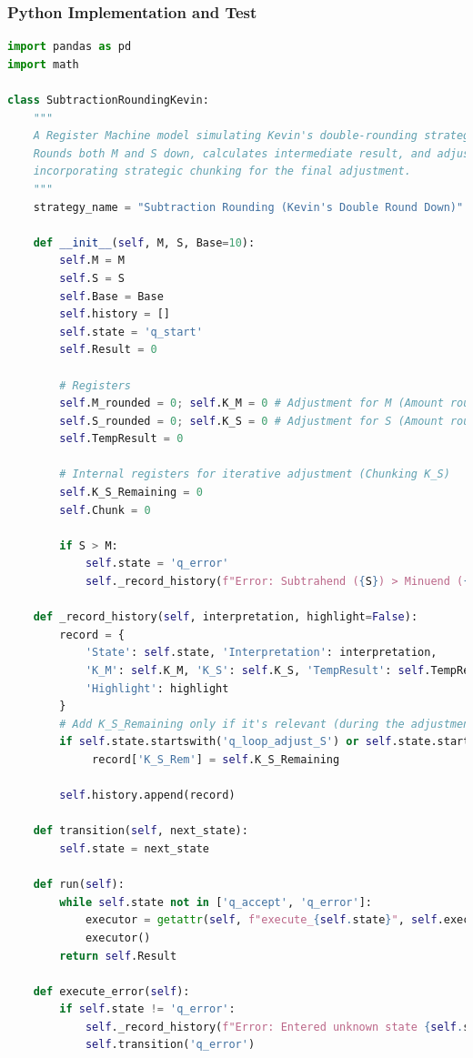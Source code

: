 \documentclass[11pt]{article}
\begin{document}
\subsubsection*{Python Implementation and Test}

\begin{lstlisting}[language=Python]
import pandas as pd
import math

class SubtractionRoundingKevin:
    """
    A Register Machine model simulating Kevin's double-rounding strategy (e.g., 84-29).
    Rounds both M and S down, calculates intermediate result, and adjusts sequentially,
    incorporating strategic chunking for the final adjustment.
    """
    strategy_name = "Subtraction Rounding (Kevin's Double Round Down)"

    def __init__(self, M, S, Base=10):
        self.M = M
        self.S = S
        self.Base = Base
        self.history = []
        self.state = 'q_start'
        self.Result = 0

        # Registers
        self.M_rounded = 0; self.K_M = 0 # Adjustment for M (Amount rounded down)
        self.S_rounded = 0; self.K_S = 0 # Adjustment for S (Amount rounded down)
        self.TempResult = 0

        # Internal registers for iterative adjustment (Chunking K_S)
        self.K_S_Remaining = 0
        self.Chunk = 0

        if S > M:
            self.state = 'q_error'
            self._record_history(f"Error: Subtrahend ({S}) > Minuend ({M}).")

    def _record_history(self, interpretation, highlight=False):
        record = {
            'State': self.state, 'Interpretation': interpretation,
            'K_M': self.K_M, 'K_S': self.K_S, 'TempResult': self.TempResult,
            'Highlight': highlight
        }
        # Add K_S_Remaining only if it's relevant (during the adjustment loop)
        if self.state.startswith('q_loop_adjust_S') or self.state.startswith('q_init_adjust_S'):
             record['K_S_Rem'] = self.K_S_Remaining

        self.history.append(record)

    def transition(self, next_state):
        self.state = next_state

    def run(self):
        while self.state not in ['q_accept', 'q_error']:
            executor = getattr(self, f"execute_{self.state}", self.execute_error)
            executor()
        return self.Result

    def execute_error(self):
        if self.state != 'q_error':
            self._record_history(f"Error: Entered unknown state {self.state}")
            self.transition('q_error')


\end{lstlisting}
\end{document}
